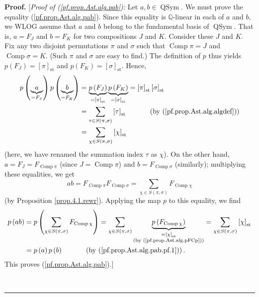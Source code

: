 \documentclass[numbers=enddot,12pt,final,onecolumn,notitlepage]{scrartcl}%
\theoremstyle{definition}
\newenvironment{proof}[1][Proof]{\noindent\textbf{#1.} }{\ \rule{0.5em}{0.5em}}
\newenvironment{verlong}{}{}
\let\sumnonlimits\sum
\renewcommand{\sum}{\sumnonlimits\limits}
\begin{document}
\begin{verlong}
\begin{proof}
[\textit{Proof of (\ref{pf.prop.Ast.alg.pab}):} Let $a,b\in
\operatorname*{QSym}$. We must prove the equality (\ref{pf.prop.Ast.alg.pab}).
Since this equality is $\mathbb{Q}$-linear in each of $a$ and $b$, we WLOG
assume that $a$ and $b$ belong to the fundamental basis of
$\operatorname*{QSym}$. That is, $a=F_{J}$ and $b=F_{K}$ for two compositions
$J$ and $K$. Consider these $J$ and $K$. Fix any two disjoint permutations
$\pi$ and $\sigma$ such that $\operatorname*{Comp}\pi=J$ and
$\operatorname*{Comp}\sigma=K$. (Such $\pi$ and $\sigma$ are easy to find.)
The definition of $p$ thus yields $p\left(  F_{J}\right)  =\left[  \pi\right]
_{\operatorname*{st}}$ and $p\left(  F_{K}\right)  =\left[  \sigma\right]
_{\operatorname*{st}}$. Hence,%
\begin{align}
p\left(  \underbrace{a}_{=F_{J}}\right)  p\left(  \underbrace{b}_{=F_{K}%
}\right)   &  =\underbrace{p\left(  F_{J}\right)  }_{=\left[  \pi\right]
_{\operatorname*{st}}}\underbrace{p\left(  F_{K}\right)  }_{=\left[
\sigma\right]  _{\operatorname*{st}}}=\left[  \pi\right]  _{\operatorname*{st}%
}\left[  \sigma\right]  _{\operatorname*{st}}\nonumber\\
&  =\sum_{\tau\in S\left(  \pi,\sigma\right)  }\left[  \tau\right]
_{\operatorname*{st}}\ \ \ \ \ \ \ \ \ \ \left(  \text{by
(\ref{pf.prop.Ast.alg.algdef})}\right) \nonumber\\
&  =\sum_{\chi\in S\left(  \pi,\sigma\right)  }\left[  \chi\right]
_{\operatorname*{st}} \label{pf.prop.Ast.alg.pab.pf.1}%
\end{align}
(here, we have renamed the summation index $\tau$ as $\chi$). On the other
hand, $a=F_{J}=F_{\operatorname*{Comp}\pi}$ (since $J=\operatorname*{Comp}\pi
$) and $b=F_{\operatorname*{Comp}\sigma}$ (similarly); multiplying these
equalities, we get%
\[
ab=F_{\operatorname*{Comp}\pi}F_{\operatorname*{Comp}\sigma}=\sum_{\chi\in
S\left(  \pi,\sigma\right)  }F_{\operatorname*{Comp}\chi}%
\]
(by Proposition \ref{prop.4.1.rewr}). Applying the map $p$ to this equality,
we find%
\begin{align*}
p\left(  ab\right)   &  =p\left(  \sum_{\chi\in S\left(  \pi,\sigma\right)
}F_{\operatorname*{Comp}\chi}\right)  =\sum_{\chi\in S\left(  \pi
,\sigma\right)  }\underbrace{p\left(  F_{\operatorname*{Comp}\chi}\right)
}_{\substack{=\left[  \chi\right]  _{\operatorname*{st}}\\\text{(by
(\ref{pf.prop.Ast.alg.pFCp}))}}}=\sum_{\chi\in S\left(  \pi,\sigma\right)
}\left[  \chi\right]  _{\operatorname*{st}}\\
&  =p\left(  a\right)  p\left(  b\right)  \ \ \ \ \ \ \ \ \ \ \left(  \text{by
(\ref{pf.prop.Ast.alg.pab.pf.1})}\right)  .
\end{align*}
This proves (\ref{pf.prop.Ast.alg.pab}).]


\end{proof}
\end{verlong}
\end{document}
